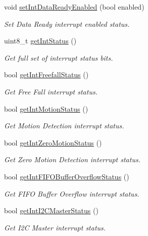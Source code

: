 \begin{DoxyCompactItemize}
void \mbox{\hyperlink{classMPU6050_a67a11be7fc7ab6b1186469b94ea33dda}{set\+Int\+Data\+Ready\+Enabled}} (bool enabled)
\begin{DoxyCompactList}\small\item\em Set Data Ready interrupt enabled status. \end{DoxyCompactList}\item 
uint8\+\_\+t \mbox{\hyperlink{classMPU6050_a550a735623cb1de950c72cd6931ee804}{get\+Int\+Status}} ()
\begin{DoxyCompactList}\small\item\em Get full set of interrupt status bits. \end{DoxyCompactList}\item 
bool \mbox{\hyperlink{classMPU6050_a06bbc2116235b7cc5e28c877e0576749}{get\+Int\+Freefall\+Status}} ()
\begin{DoxyCompactList}\small\item\em Get Free Fall interrupt status. \end{DoxyCompactList}\item 
bool \mbox{\hyperlink{classMPU6050_ac0c0836aa0d237cac92d11591efd0d9f}{get\+Int\+Motion\+Status}} ()
\begin{DoxyCompactList}\small\item\em Get Motion Detection interrupt status. \end{DoxyCompactList}\item 
bool \mbox{\hyperlink{classMPU6050_afa73a5ffdc423736ae88702a469ba3a0}{get\+Int\+Zero\+Motion\+Status}} ()
\begin{DoxyCompactList}\small\item\em Get Zero Motion Detection interrupt status. \end{DoxyCompactList}\item 
bool \mbox{\hyperlink{classMPU6050_aa31427588f059c69d93ddb00ba257b12}{get\+Int\+F\+I\+F\+O\+Buffer\+Overflow\+Status}} ()
\begin{DoxyCompactList}\small\item\em Get F\+I\+FO Buffer Overflow interrupt status. \end{DoxyCompactList}\item 
bool \mbox{\hyperlink{classMPU6050_a31d6c2b03fc2d6ce82d67d142f316851}{get\+Int\+I2\+C\+Master\+Status}} ()
\begin{DoxyCompactList}\small\item\em Get I2C Master interrupt status. \end{DoxyCompactList}\item 

\end{DoxyCompactItemize}
